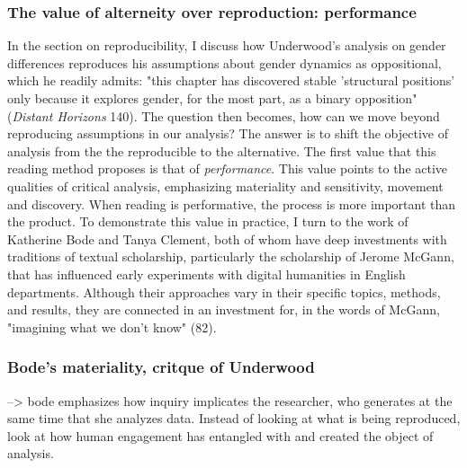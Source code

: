 \documentclass[11pt]{article}
\begin{document}
\subsubsection{The value of alterneity over reproduction: performance}
\label{sec:org3b8be10}
In the section on reproducibility, I discuss how Underwood's analysis
on gender differences reproduces his assumptions about gender dynamics
as oppositional, which he readily admits: "this chapter has discovered
stable 'structural positions' only because it explores gender, for the
most part, as a binary opposition" (\emph{Distant Horizons} 140). The
question then becomes, how can we move beyond reproducing assumptions
in our analysis? The answer is to shift the objective of analysis from
the the reproducible to the alternative. The first value that this
reading method proposes is that of \emph{performance}. This value points to
the active qualities of critical analysis, emphasizing materiality and
sensitivity, movement and discovery. When reading is performative, the
process is more important than the product. To demonstrate this value
in practice, I turn to the work of Katherine Bode and Tanya Clement,
both of whom have deep investments with traditions of textual
scholarship, particularly the scholarship of Jerome McGann, that has
influenced early experiments with digital humanities in English
departments. Although their approaches vary in their specific topics,
methods, and results, they are connected in an investment for, in the
words of McGann, "imagining what we don't know" (82).

\subsubsection{Bode's materiality,  critque of Underwood}
\label{sec:orgca98e02}
--> bode emphasizes how inquiry implicates the researcher, who
generates at the same time that she analyzes data. Instead of looking
at what is being reproduced, look at how human engagement has
entangled with and created the object of analysis.
\end{document}
